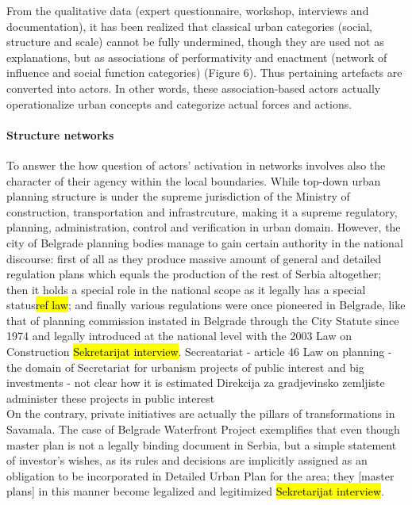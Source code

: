 \documentclass[11pt]{report}
\begin{document}
From the qualitative data (expert questionnaire, workshop, interviews and documentation), it has been realized that classical urban categories (social, structure and scale) cannot be fully undermined, though they are used not as explanations, but as associations of performativity and enactment (network of influence and social function categories) (Figure 6). Thus pertaining artefacts are converted into actors. In other words, these association-based actors actually operationalize urban concepts and categorize actual forces and actions.

\paragraph{Structure networks}

To answer the how question of actors' activation in networks involves also the character of their agency within the local boundaries.
While top-down urban planning structure is under the supreme jurisdiction of the Ministry of construction, transportation and infrastrcuture, making it a supreme regulatory, planning, administration, control and verification in urban domain.
However, the city of Belgrade planning bodies manage to gain certain authority in the national discourse: first of all as they produce massive amount of general and detailed regulation plans which equals the production of the rest of Serbia altogether; then it holds a special role in the national scope as it legally has a special status\footnotemark \hl{ref law}; and finally various regulations were once pioneered in Belgrade, like that of planning commission instated in Belgrade through the City Statute since 1974 and legally introduced at the national level with the 2003 Law on Construction \hl{Sekretarijat interview}.
Secreatariat - article 46 Law on planning - the domain of Secretariat for urbanism
projects of public interest and big investments - not clear how it is estimated
Direkcija za gradjevinsko zemljiste administer these projects in public interest
\\
On the contrary, private initiatives are actually the pillars of transformations in Savamala. The case of Belgrade Waterfront Project exemplifies that even though master plan is not a legally binding document in Serbia, but a simple statement of investor's wishes, as its rules and decisions are implicitly assigned as an obligation to be incorporated in Detailed Urban Plan for the area; they [master plans] in this manner become legalized and legitimized \hl{Sekretarijat interview}.
\end{document}
